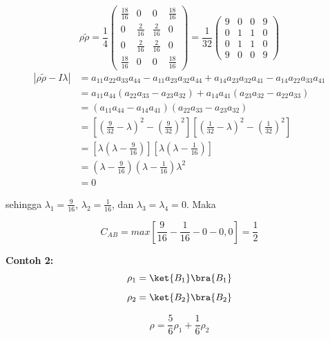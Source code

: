 \begin{equation}
	\rho \tilde{\rho}=\frac{1}{4}
	\begin{pmatrix}
		\frac{18}{16}&0&0&\frac{18}{16}\\
		0&\frac{2}{16}&\frac{2}{16}&0\\
		0&\frac{2}{16}&\frac{2}{16}&0\\
		\frac{18}{16}&0&0&\frac{18}{16}
	\end{pmatrix}
	=\frac{1}{32}
	\begin{pmatrix}
		9&0&0&9\\
		0&1&1&0\\
		0&1&1&0\\
		9&0&0&9
	\end{pmatrix}
\end{equation}
\begin{equation}
	\begin{aligned}
		|\rho \tilde{\rho}-I\lambda|
		&=a_{11}a_{22}a_{33}a_{44}-a_{11}a_{23}a_{32}a_{44}+a_{14}a_{23}a_{32}a_{41}-a_{14}a_{22}a_{33}a_{41}\\
		&=a_{11}a_{44}(a_{22}a_{33}-a_{23}a_{32})+a_{14}a_{41}(a_{23}a_{32}-a_{22}a_{33})\\
		&=(a_{11}a_{44}-a_{14}a_{41})(a_{22}a_{33}-a_{23}a_{32})\\
		&=[(\frac{9}{32}-\lambda)^2-(\frac{9}{32})^2][(\frac{1}{32}-\lambda)^2-(\frac{1}{32})^2]\\
		&=[\lambda(\lambda-\frac{9}{16})][\lambda(\lambda-\frac{1}{16})]\\
		&=(\lambda-\frac{9}{16})(\lambda-\frac{1}{16})\lambda^2\\
		&=0
	\end{aligned}
\end{equation}

sehingga $\lambda_1=\frac{9}{16}$, $\lambda_2=\frac{1}{16}$, dan $\lambda_3=\lambda_4=0$. Maka

\begin{equation}
	C_{AB}=max[\frac{9}{16}-\frac{1}{16}-0-0,0]=\frac{1}{2}
\end{equation}

\textbf{Contoh 2:}
\begin{equation}
	\rho_1 = \ket{B_1}\bra{B_1}
\end{equation}
\begin{equation}
	\rho_2 = \ket{B_2}\bra{B_2}
\end{equation}

\begin{equation}
	\rho = \frac{5}{6}\rho_1 + \frac{1}{6}\rho_2
\end{equation}


